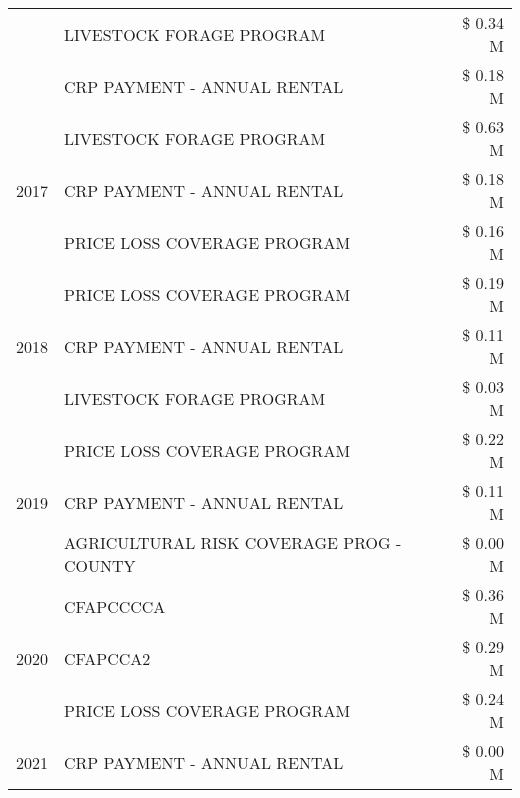 \begin{tabular}{llr}
 & LIVESTOCK FORAGE PROGRAM                      & \$ 0.34 M \\
 & CRP PAYMENT - ANNUAL RENTAL                   & \$ 0.18 M \\
\cline{1-3}
\multirow[t]{3}{*}{2017} & LIVESTOCK FORAGE PROGRAM & \$ 0.63 M \\
 & CRP PAYMENT - ANNUAL RENTAL & \$ 0.18 M \\
 & PRICE LOSS COVERAGE PROGRAM & \$ 0.16 M \\
\cline{1-3}
\multirow[t]{3}{*}{2018} & PRICE LOSS COVERAGE PROGRAM & \$ 0.19 M \\
 & CRP PAYMENT - ANNUAL RENTAL & \$ 0.11 M \\
 & LIVESTOCK FORAGE PROGRAM & \$ 0.03 M \\
\cline{1-3}
\multirow[t]{3}{*}{2019} & PRICE LOSS COVERAGE PROGRAM & \$ 0.22 M \\
 & CRP PAYMENT - ANNUAL RENTAL & \$ 0.11 M \\
 & AGRICULTURAL RISK COVERAGE PROG - COUNTY & \$ 0.00 M \\
\cline{1-3}
\multirow[t]{3}{*}{2020} & CFAPCCCCA & \$ 0.36 M \\
 & CFAPCCA2 & \$ 0.29 M \\
 & PRICE LOSS COVERAGE PROGRAM & \$ 0.24 M \\
\cline{1-3}
2021 & CRP PAYMENT - ANNUAL RENTAL & \$ 0.00 M \\
\cline{1-3}
\bottomrule
\end{tabular}
